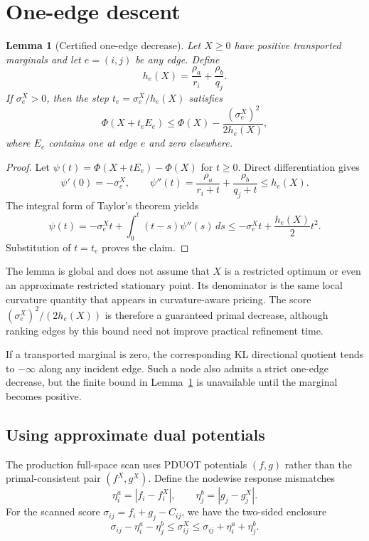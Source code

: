 \documentclass[11pt]{article}
\newtheorem{lemma}{Lemma}
\begin{document}
\section{One-edge descent}

\begin{lemma}[Certified one-edge decrease]\label{lem:one-edge}
Let $X\geq0$ have positive transported marginals and let $e=(i,j)$ be any edge.
Define
$$h_e(X)=\frac{\rho_a}{r_i}+\frac{\rho_b}{q_j}.$$
If $\sigma_e^X>0$, then the step $t_e=\sigma_e^X/h_e(X)$ satisfies
$$\Phi(X+t_eE_e)\leq\Phi(X)-\frac{(\sigma_e^X)^2}{2h_e(X)},$$
where $E_e$ contains one at edge $e$ and zero elsewhere.
\end{lemma}

\begin{proof}
Let $\psi(t)=\Phi(X+tE_e)-\Phi(X)$ for $t\geq0$.
Direct differentiation gives
$$\psi'(0)=-\sigma_e^X,\qquad \psi''(t)=\frac{\rho_a}{r_i+t}+\frac{\rho_b}{q_j+t}\leq h_e(X).$$
The integral form of Taylor's theorem yields
$$\psi(t)=-\sigma_e^Xt+\int_0^t(t-s)\psi''(s)\,ds\leq-\sigma_e^Xt+\frac{h_e(X)}{2}t^2.$$
Substitution of $t=t_e$ proves the claim.
\end{proof}

The lemma is global and does not assume that $X$ is a restricted optimum or even an approximate restricted stationary point.
Its denominator is the same local curvature quantity that appears in curvature-aware pricing.
The score $(\sigma_e^X)^2/(2h_e(X))$ is therefore a guaranteed primal decrease, although ranking edges by this bound need not improve practical refinement time.

If a transported marginal is zero, the corresponding KL directional quotient tends to $-\infty$ along any incident edge.
Such a node also admits a strict one-edge decrease, but the finite bound in Lemma~\ref{lem:one-edge} is unavailable until the marginal becomes positive.

\subsection{Using approximate dual potentials}

The production full-space scan uses PDUOT potentials $(f,g)$ rather than the primal-consistent pair $(f^X,g^X)$.
Define the nodewise response mismatches
$$\eta_i^a=|f_i-f_i^X|,\qquad \eta_j^b=|g_j-g_j^X|.$$
For the scanned score $\sigma_{ij}=f_i+g_j-C_{ij}$, we have the two-sided enclosure
$$\sigma_{ij}-\eta_i^a-\eta_j^b\leq\sigma_{ij}^X\leq\sigma_{ij}+\eta_i^a+\eta_j^b.$$
\end{document}
